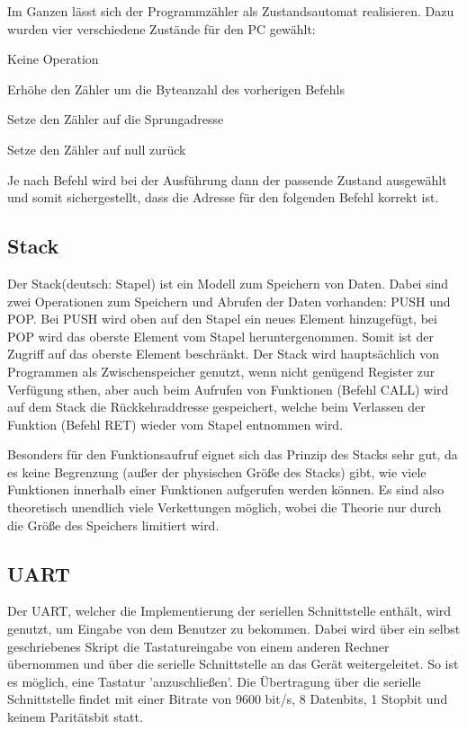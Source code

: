 Im Ganzen lässt sich der Programmzähler als Zustandsautomat realisieren. Dazu
wurden vier verschiedene Zustände für den \ac{PC} gewählt:

\begin{description}[align=right, labelwidth=1.6cm]
\item[NOP]		Keine Operation
\item[INC]		Erhöhe den Zähler um die Byteanzahl des vorherigen Befehls
\item[ASSIGN]	Setze den Zähler auf die Sprungadresse
\item[RESET]	Setze den Zähler auf null zurück
\end{description}

Je nach Befehl wird bei der Ausführung dann der passende Zustand ausgewählt und
somit sichergestellt, dass die Adresse für den folgenden Befehl korrekt ist.
\subsection{Stack}
\label{s:stack}
Der Stack(deutsch: Stapel) ist ein Modell zum Speichern von Daten. Dabei sind
zwei Operationen zum Speichern und Abrufen der Daten vorhanden: PUSH und POP\@.
Bei PUSH wird oben auf den Stapel ein neues Element hinzugefügt, bei POP wird
das oberste Element vom Stapel heruntergenommen. Somit ist der Zugriff auf das
oberste Element beschränkt. Der Stack wird hauptsächlich von Programmen als
Zwischenspeicher genutzt, wenn nicht genügend Register zur Verfügung sthen, aber
auch beim Aufrufen von Funktionen (Befehl CALL) wird auf dem Stack die Rückkehraddresse
gespeichert, welche beim Verlassen der Funktion (Befehl RET) wieder
vom Stapel entnommen wird.

Besonders für den Funktionsaufruf eignet sich das Prinzip des Stacks sehr gut,
da es keine Begrenzung (außer der physischen Größe des Stacks) gibt, wie viele
Funktionen innerhalb einer Funktionen aufgerufen werden können. Es sind also
theoretisch unendlich viele Verkettungen möglich, wobei die Theorie nur durch
die Größe des Speichers limitiert wird.
\subsection{UART}
\label{s:uart}
Der \ac{UART}, welcher die Implementierung der seriellen Schnittstelle enthält,
wird genutzt, um Eingabe von dem Benutzer zu bekommen. Dabei wird über ein
selbst geschriebenes Skript die Tastatureingabe von einem anderen Rechner
übernommen und über die serielle Schnittstelle an das Gerät weitergeleitet. So
ist es möglich, eine Tastatur 'anzuschließen'. Die Übertragung über die serielle
Schnittstelle findet mit einer Bitrate von 9600 bit/s, 8 Datenbits, 1 Stopbit
und keinem Paritätsbit statt.

